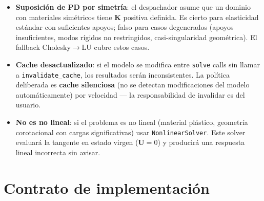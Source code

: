 \documentclass[11pt,letterpaper,oneside]{report}
\begin{document}
\begin{itemize}
  \item \textbf{Suposición de PD por simetría}: el despachador asume que un dominio con materiales simétricos tiene $\mathbf K$ positiva definida. Es cierto para elasticidad estándar con suficientes apoyos; falso para casos degenerados (apoyos insuficientes, modos rígidos no restringidos, casi-singularidad geométrica). El fallback Cholesky\ensuremath{\to}LU cubre estos casos.
  \item \textbf{Cache desactualizado}: si el modelo se modifica entre \texttt{solve} calls sin llamar a \texttt{invalidate\_cache}, los resultados serán inconsistentes. La política deliberada es \textbf{cache silenciosa} (no se detectan modificaciones del modelo automáticamente) por velocidad --- la responsabilidad de invalidar es del usuario.
  \item \textbf{No es no lineal}: si el problema es no lineal (material plástico, geometría corotacional con cargas significativas) usar \texttt{NonlinearSolver}. Este solver evaluará la tangente en estado virgen ($\mathbf U = 0$) y producirá una respuesta lineal incorrecta sin avisar.
\end{itemize}


\section{Contrato de implementación}
\end{document}
